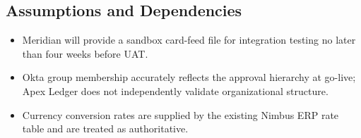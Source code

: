 \subsection{Assumptions and Dependencies}
\begin{itemize}[leftmargin=1.4em]
  \item Meridian will provide a sandbox card-feed file for integration testing no later than
        four weeks before UAT.
  \item Okta group membership accurately reflects the approval hierarchy at go-live; Apex
        Ledger does not independently validate organizational structure.
  \item Currency conversion rates are supplied by the existing Nimbus ERP rate table and are
        treated as authoritative.
\end{itemize}
